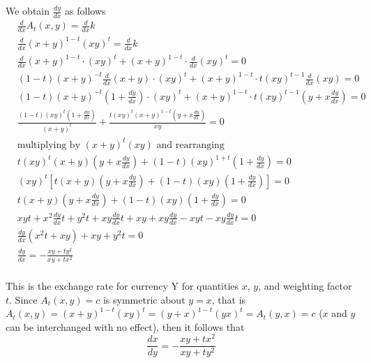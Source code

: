 \documentclass{article}
\begin{document}
\noindent We obtain $\frac{dy}{dx}$ as follows
\begin{equation*}
\begin{split}
    & \frac{d}{dx} A_t(x,y) = \frac{d}{dx} k \\[0pt]
    & \frac{d}{dx} (x + y)^{1-t}(xy)^{t} = \frac{d}{dx} k \\[0pt]
    & \frac{d}{dx} (x + y)^{1-t} \cdot (xy)^{t} + (x + y)^{1-t} \cdot \frac{d}{dx} (xy)^{t} = 0 \\[3pt]
    & (1-t)(x + y)^{-t} \frac{d}{dx} (x + y) \cdot (xy)^{t} + (x + y)^{1-t} \cdot t(xy)^{t-1} \frac{d}{dx} (xy) = 0 \\[3pt]
    & (1-t)(x + y)^{-t}\left(1 + \frac{dy}{dx}\right) \cdot (xy)^{t} + (x + y)^{1-t} \cdot t(xy)^{t-1}\left(y + x\frac{dy}{dx}\right) = 0 \\[3pt]
    & \frac{ (1-t)(xy)^t(1 + \frac{dy}{dx}) }{(x+y)^t} + \frac{ t(xy)^t(x+y)^{1-t}(y + x\frac{dy}{dx}) }{xy} = 0 \\[3pt]
    & \text{multiplying by $(x+y)^t(xy)$ and rearranging} \\[3pt]
    & t(xy)^t(x+y)\left(y + x\frac{dy}{dx}\right) + (1-t)(xy)^{1+t}\left(1 + \frac{dy}{dx}\right) = 0 \\[3pt]
    & (xy)^t \left[ t(x+y)\left(y + x\frac{dy}{dx}\right) + (1-t)(xy)\left(1 + \frac{dy}{dx} \right) \right] = 0 \\[3pt]
    & t(x+y)\left(y + x\frac{dy}{dx}\right) + (1-t)(xy)\left(1 + \frac{dy}{dx}\right) = 0 \\[3pt]
    & xyt + x^2\frac{dy}{dx}t + y^2t + xy\frac{dy}{dx}t + xy + xy\frac{dy}{dx} - xyt - xy\frac{dy}{dx}t = 0 \\[3pt]
    & \frac{dy}{dx} \left( x^2t + xy \right) + xy + y^2t = 0 \\[3pt]
    & \frac{dy}{dx} = - \frac{xy+ty^2}{xy+tx^2} \\[0pt]
\end{split}
\end{equation*}

\noindent This is the exchange rate for currency Y for quantities $x$, $y$, and weighting factor $t$. Since $A_t(x,y) = c$ is symmetric about $y=x$, that is $A_t(x,y) = (x+y)^{1-t}(xy)^t = (y+x)^{1-t}(yx)^t = A_t(y,x) = c$ ($x$ and $y$ can be interchanged with no effect), then it follows that
$$ \frac{dx}{dy} = - \frac{xy+tx^2}{xy+ty^2} $$
\end{document}

